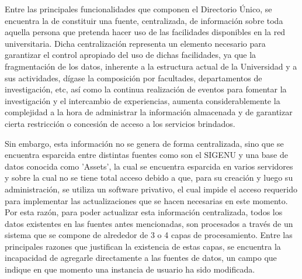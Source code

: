 Entre las principales funcionalidades que componen el Directorio \'Unico, se encuentra la de constituir una fuente, centralizada, de informaci\'on sobre toda aquella persona que pretenda hacer uso de las facilidades disponibles en la red universitaria. Dicha centralizaci\'on representa un elemento necesario para garantizar el control apropiado del uso de dichas facilidades, ya que la fragmentaci\'on de los datos, inherente a la estructura actual de la Universidad y a sus actividades, d\'igase la composici\'on por facultades, departamentos de investigación, etc, as\'i como la continua realizaci\'on de eventos para fomentar la investigaci\'on y el intercambio de experiencias, aumenta considerablemente la complejidad a la hora de administrar la informaci\'on almacenada y de garantizar cierta restricci\'on o concesi\'on de acceso a los servicios brindados. 

Sin embargo, esta informaci\'on no se genera de forma centralizada, sino que se encuentra esparcida entre distintas fuentes como son el SIGENU  y una base de datos conocida como 'Assets', la cual se encuentra esparcida en varios servidores y sobre la cual no se tiene total acceso debido a que, para su creaci\'on y luego su administraci\'on, se utiliza un software privativo, el cual impide el acceso requerido para implementar las actualizaciones que se hacen necesarias en este momento.  
Por esta raz\'on, para poder actualizar esta informaci\'on centralizada, todos los datos existentes en las fuentes antes mencionadas, son procesados a trav\'es de un sistema que se compone de alrededor de 3 o 4 capas de procesamiento. Entre las principales razones que justifican la existencia de estas capas, se encuentra la incapacidad de agregarle directamente a las fuentes de datos, un campo que indique en que momento una instancia de usuario ha sido modificada.


